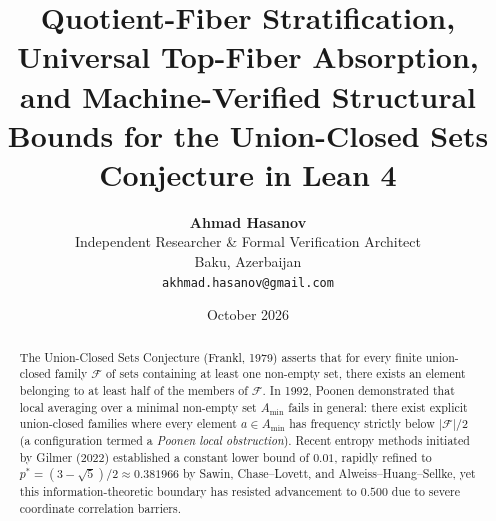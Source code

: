 \documentclass[11pt,a4paper]{article}
\title{\textbf{Quotient-Fiber Stratification, Universal Top-Fiber Absorption, and Machine-Verified Structural Bounds for the Union-Closed Sets Conjecture in Lean 4}}
\author{
    \textbf{Ahmad Hasanov} \\
    Independent Researcher \& Formal Verification Architect \\
    Baku, Azerbaijan \\
    \texttt{\small akhmad.hasanov@gmail.com}
}
\date{October 2026}
\theoremstyle{plain}
\theoremstyle{definition}
\theoremstyle{remark}
\newcommand{\F}{\mathcal{F}}
\begin{document}
\maketitle

\begin{abstract}
The Union-Closed Sets Conjecture (Frankl, 1979) asserts that for every finite union-closed family $\F$ of sets containing at least one non-empty set, there exists an element belonging to at least half of the members of $\F$. In 1992, Poonen demonstrated that local averaging over a minimal non-empty set $A_{\min}$ fails in general: there exist explicit union-closed families where every element $a \in A_{\min}$ has frequency strictly below $|\F|/2$ (a configuration termed a \emph{Poonen local obstruction}). Recent entropy methods initiated by Gilmer (2022) established a constant lower bound of $0.01$, rapidly refined to $p^* = (3 - \sqrt{5})/2 \approx 0.381966$ by Sawin, Chase--Lovett, and Alweiss--Huang--Sellke, yet this information-theoretic boundary has resisted advancement to $0.500$ due to severe coordinate correlation barriers.


\end{abstract}
\end{document}
